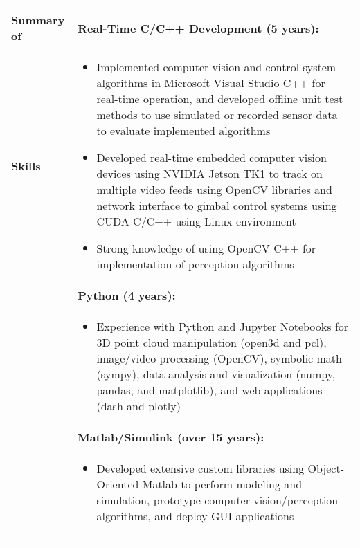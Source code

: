\begin{tabular}{L{\hlcolw}  L{\rcolw}}
	\hline \hline \\
	\textbf{\Large Summary of } & 
	\textbf{Real-Time C/C++ Development (5 years):}
	\\
	
	\textbf{\Large Skills} & 
	\vspace{-0.25in}
	\begin{itemize}[leftmargin = \itemmargin]
		\item Implemented computer vision and control system algorithms in Microsoft Visual Studio C++ for real-time operation, and developed offline unit test methods to use simulated or recorded sensor data to evaluate implemented algorithms
	
		\item Developed real-time embedded computer vision devices using NVIDIA Jetson TK1 to track on multiple video feeds using OpenCV libraries and network interface to gimbal control systems using CUDA C/C++ using Linux environment
		
		\item Strong knowledge of using OpenCV C++ for implementation of perception algorithms
	
	\end{itemize} \\
	
	& \textbf{Python (4 years):} \\
	&
	\vspace{-0.25in}
	\begin{itemize}[leftmargin = \itemmargin]
		\item Experience with Python and Jupyter Notebooks for 3D point cloud manipulation (open3d and pcl), image/video processing (OpenCV), symbolic math (sympy), 
		data analysis and visualization (numpy, pandas, and matplotlib), and web applications (dash and plotly)
	\end{itemize}
	\\
	
	& \textbf{Matlab/Simulink (over 15 years):} \\
	& 	
	\vspace{-0.25in}
	\begin{itemize}[leftmargin = \itemmargin]
		
		\item Developed extensive custom libraries using Object-Oriented Matlab to perform modeling and simulation, 
		prototype computer vision/perception algorithms, and deploy GUI applications
		
	\end{itemize} 
	\\
	
	\hline \\
\end{tabular}